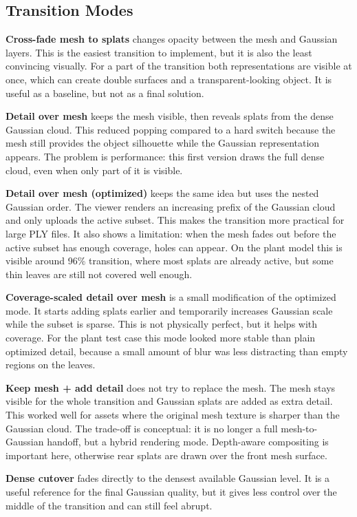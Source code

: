 \documentclass{egpubl}
\begin{document}
\subsection{Transition Modes}

\textbf{Cross-fade mesh to splats} changes opacity between the mesh and Gaussian layers. This is the easiest transition to implement,
but it is also the least convincing visually. For a part of the transition both representations are visible at once,
which can create double surfaces and a transparent-looking object. It is useful as a baseline, but not as a final solution.

\textbf{Detail over mesh} keeps the mesh visible, then reveals splats from the dense Gaussian cloud.
This reduced popping compared to a hard switch because the mesh still provides the object silhouette while the Gaussian
representation appears. The problem is performance: this first version draws the full dense cloud, even when only part of it is visible.

\textbf{Detail over mesh (optimized)} keeps the same idea but uses the nested Gaussian order. The viewer renders an
increasing prefix of the Gaussian cloud and only uploads the active subset. This makes the transition more practical for
large PLY files. It also shows a limitation: when the mesh fades out before the active subset has enough coverage,
holes can appear. On the plant model this is visible around 96\% transition, where most splats are already active,
but some thin leaves are still not covered well enough.

\textbf{Coverage-scaled detail over mesh} is a small modification of the optimized mode. It starts adding splats earlier
and temporarily increases Gaussian scale while the subset is sparse. This is not physically perfect, but it helps with coverage.
For the plant test case this mode looked more stable than plain optimized detail, because a small amount of blur was less distracting
than empty regions on the leaves.

\textbf{Keep mesh + add detail} does not try to replace the mesh. The mesh stays visible for the whole transition and Gaussian
splats are added as extra detail. This worked well for assets where the original mesh texture is sharper than the Gaussian cloud.
The trade-off is conceptual: it is no longer a full mesh-to-Gaussian handoff, but a hybrid rendering mode.
Depth-aware compositing is important here, otherwise rear splats are drawn over the front mesh surface.

\textbf{Dense cutover} fades directly to the densest available Gaussian level. It is a useful reference for the final Gaussian quality,
but it gives less control over the middle of the transition and can still feel abrupt.
\end{document}
